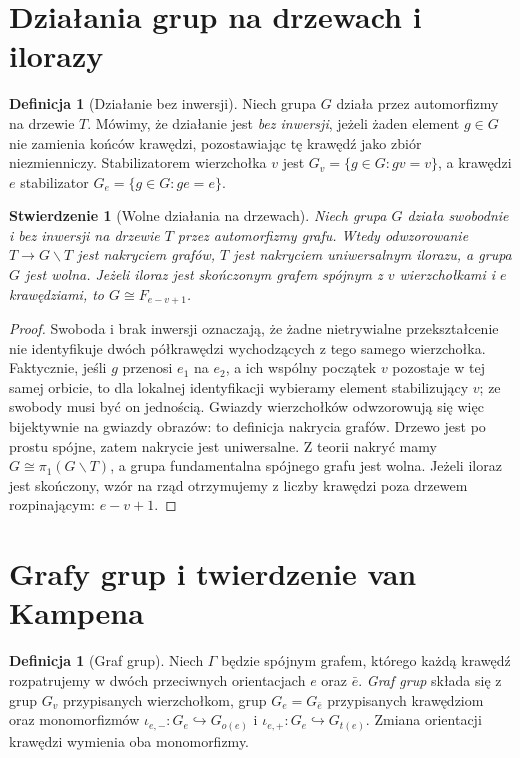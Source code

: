 \documentclass[11pt,a4paper]{report}
\numberwithin{equation}{section}
\theoremstyle{plain}
\newtheorem{stwierdzenie}[twierdzenie]{Stwierdzenie}
\theoremstyle{definition}
\newtheorem{definicja}[twierdzenie]{Definicja}
\theoremstyle{remark}
\begin{document}
\section{Działania grup na drzewach i ilorazy}
\label{sec:tg-tree-actions}

\begin{definicja}[Działanie bez inwersji]
Niech grupa $G$ działa przez automorfizmy na drzewie $T$.
Mówimy, że działanie jest \emph{bez inwersji}, jeżeli
żaden element $g\in G$ nie zamienia końców krawędzi,
pozostawiając tę krawędź jako zbiór niezmienniczy.
Stabilizatorem wierzchołka $v$ jest
$G_v=\{g\in G:gv=v\}$, a krawędzi $e$ stabilizator
$G_e=\{g\in G:ge=e\}$.
\end{definicja}

\begin{stwierdzenie}[Wolne działania na drzewach]
Niech grupa $G$ działa swobodnie i bez inwersji na drzewie
$T$ przez automorfizmy grafu. Wtedy odwzorowanie
$T\to G\backslash T$ jest nakryciem grafów, $T$ jest
nakryciem uniwersalnym ilorazu, a grupa $G$ jest wolna.
Jeżeli iloraz jest skończonym grafem spójnym z $v$
wierzchołkami i $e$ krawędziami, to $G\cong F_{e-v+1}$.
\end{stwierdzenie}
\begin{proof}
Swoboda i brak inwersji oznaczają, że żadne nietrywialne
przekształcenie nie identyfikuje dwóch półkrawędzi
wychodzących z tego samego wierzchołka. Faktycznie,
jeśli $g$ przenosi $e_1$ na $e_2$, a ich wspólny początek
$v$ pozostaje w tej samej orbicie, to dla lokalnej
identyfikacji wybieramy element stabilizujący $v$;
ze swobody musi być on jednością. Gwiazdy wierzchołków
odwzorowują się więc bijektywnie na gwiazdy obrazów:
to definicja nakrycia grafów. Drzewo jest po prostu
spójne, zatem nakrycie jest uniwersalne. Z teorii
nakryć mamy $G\cong\pi_1(G\backslash T)$, a grupa
fundamentalna spójnego grafu jest wolna. Jeżeli
iloraz jest skończony, wzór na rząd otrzymujemy z
liczby krawędzi poza drzewem rozpinającym: $e-v+1$.
\end{proof}

\section{Grafy grup i twierdzenie van Kampena}
\label{sec:tg-graphs-of-groups}

\begin{definicja}[Graf grup]
Niech $\Gamma$ będzie spójnym grafem, którego każdą
krawędź rozpatrujemy w dwóch przeciwnych orientacjach
$e$ oraz $\bar e$. \emph{Graf grup} składa się z grup
$G_v$ przypisanych wierzchołkom, grup $G_e=G_{\bar e}$
przypisanych krawędziom oraz monomorfizmów
$\iota_{e,-}:G_e\hookrightarrow G_{o(e)}$ i
$\iota_{e,+}:G_e\hookrightarrow G_{t(e)}$.
Zmiana orientacji krawędzi wymienia oba monomorfizmy.
\end{definicja}
\end{document}
